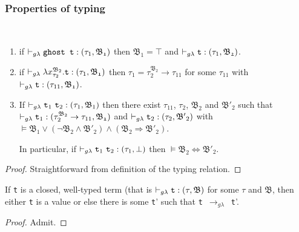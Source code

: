  




\subsubsection{Properties of typing}
\begin{lemma}~\\
\vspace{-0.5cm}
\begin{enumerate}
	\item 
	if $\vdash_{g\lambda} \texttt{ghost t} : (\tau_{1}, \mathfrak{B_{1}})$ 
	then	$ \mathfrak{B_{1}} = \top $ 
	and $\vdash_{g\lambda} \texttt{t} : (\tau_{1}, \mathfrak{B_{2}}) $.
	
 	\item
 	if $\vdash_{g\lambda} \lambda x_{\tau_{2}}^{\mathfrak{B}_{2}}.\texttt{t} : (\tau_{1}, \mathfrak{B_{1}})$
 	then $\tau_{1} = \tau_{2}^{\mathfrak{B}_{2}} \rightarrow \tau_{11}$
 	for some $\tau_{11}$ with \mbox{$\vdash_{g\lambda} \texttt{t} : (\tau_{11}, \mathfrak{B_{1}}) $}.
  
 \item 
 	If ${\vdash_{g\lambda} \texttt{t}_{1}~ \texttt{t}_{2}  : (\tau_{1}, \mathfrak{B}_{1})}$
	then there exist $\tau_{11}$, $\tau_{2}$, $\mathfrak{B_{2}}$ and 	
	$\mathfrak{B'_{2}}$
	such that \\ 
	$\vdash_{g\lambda} \texttt{t}_{1} : (\tau_{2}^{\mathfrak{B}_{2}} \rightarrow \tau_{11}, \mathfrak{B_{1}})$
		and 
	${\vdash_{g\lambda} \texttt{t}_{2} : (\tau_{2}, \mathfrak{B'}_{2})}$ with \\
	 \quad
	\mbox{$\vDash \mathfrak{B}_{1} \vee (\neg \mathfrak{B}_{2} \wedge \mathfrak{B'}_{2} ) \wedge (\mathfrak{B}_{2} \Rightarrow \mathfrak{B'}_{2})$}. 
	
	In particular, if 
 		${\vdash_{g\lambda} \texttt{t}_{1}~ \texttt{t}_{2}  : (\tau_{1}, \bot)}$
then $\vDash \mathfrak{B_{2}} \Leftrightarrow \mathfrak{B'_{2}} $.
\end{enumerate}
\end{lemma} 
\begin{proof}
Straightforward from definition of the typing relation.
\end{proof}

\begin{lemma}[Progress] 
If \texttt{t} is a closed, well-typed term 
(that is ${\vdash_{g\lambda} \texttt{t} : (\tau, \mathfrak{B})}$ 
for some $\tau$ and $\mathfrak{B}$, 
then either \texttt{t} is a value or else there is some \texttt{t}' 
such that \mbox{\texttt{t} $\rightarrow_{g\lambda}$ \texttt{t}'}.
\end{lemma}
\begin{proof}
Admit.
\end{proof}

